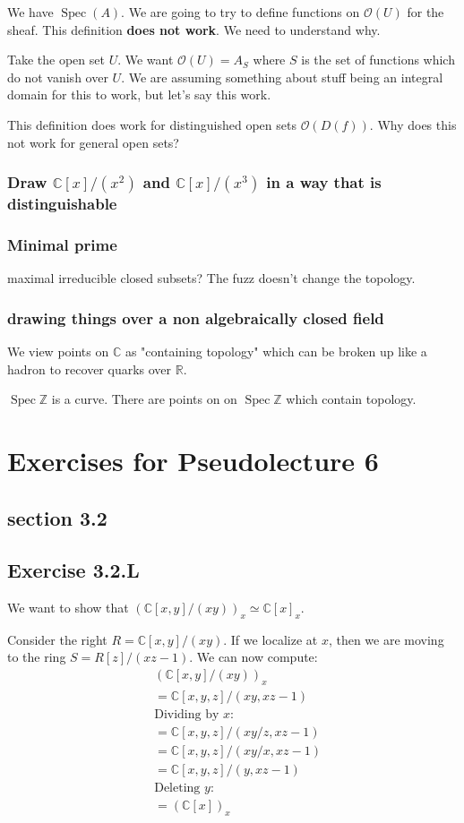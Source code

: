 \documentclass{book}
\newcommand{\Z}{\ensuremath{\mathbb{Z}}}
\newcommand{\C}{\ensuremath{\mathbb{C}}}
\newcommand{\R}{\ensuremath{\mathbb{R}}}
\renewcommand{\O}{\ensuremath{\mathcal{O}}}
\newcommand{\spec}{\operatorname{Spec}}
\theoremstyle{definition}
\begin{document}
We have $\spec(A)$. We are going to try to define functions on $\O(U)$ for the
sheaf. This definition \textbf{does not work}. We need to understand why.


Take the open set $U$. We want $\O(U) = A_{S}$ where $S$ is the set of functions
which do not vanish over $U$. We are assuming something about stuff being
an integral domain for this to work, but let's say this work.

This definition does work for distinguished open sets $\O(D(f))$. Why does this
not work for general open sets?

\subsection{Draw $\C[x]/(x^2)$ and $\C[x]/(x^3)$ in a way that is distinguishable}

\subsection{Minimal prime}
maximal irreducible closed subsets? The fuzz doesn't change the topology. 



\subsection{drawing things over a non algebraically closed field}
We view points on $\C$ as "containing topology" which can be broken
up like a hadron to recover quarks over $\R$.

$\spec \Z$ is a curve. There are points on on $\spec \Z$ which contain
topology.

\chapter{Exercises for Pseudolecture 6}
\section{section 3.2}
\section{Exercise 3.2.L}
We want to show that $(\C[x, y]/(xy))_x \simeq \C[x]_x$.

Consider the right $R = \C[x, y]/(xy)$. If we localize at $x$, then we 
are moving to the ring $S = R[z]/(xz - 1)$. We can now compute:
\begin{align*}
&(\C[x, y]/(xy))_x \\ 
&= \C[x, y, z]/(xy, xz - 1) \\
&\text{Dividing by $x$:} \\
&= \C[x, y, z]/(xy/z, xz - 1) \\
&= \C[x, y, z]/(xy/x, xz - 1) \\
&= \C[x, y, z]/(y, xz - 1) \\
&\text{Deleting $y$:} \\
&= (\C[x])_{x} \\
\end{align*}
\end{document}
